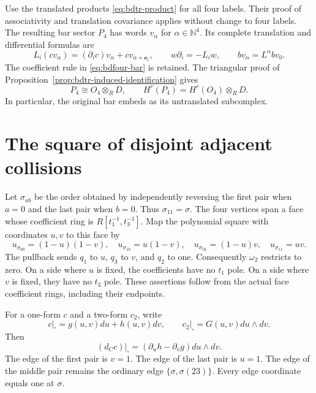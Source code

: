 Use the translated products \eqref{eq:bdtr-product} for all four labels.
Their proof of associativity and translation covariance applies without change to four labels.
The resulting bar sector $P_4$ has words $v_\alpha$ for $\alpha\in\mathbb N^4$.
Its complete translation and differential formulas are
\begin{equation}\label{eq:bdfour-jets}
 L_i(cv_\alpha)=(\partial_ic)v_\alpha+cv_{\alpha+\mathbf e_i},
 \qquad w\partial_i=-L_iw,
 \qquad bv_\alpha=L^\alpha bv_0.
\end{equation}
The coefficient rule in \eqref{eq:bdfour-bar} is retained.
The triangular proof of Proposition~\ref{prop:bdtr-induced-identification} gives
\begin{equation}\label{eq:bdfour-induced}
 P_4\cong O_4\otimes_R D,
 \qquad H^r(P_4)=H^r(O_4)\otimes_R D.
\end{equation}
In particular, the original bar embeds as its untranslated subcomplex.

\section{The square of disjoint adjacent collisions}

Let $\sigma_{ab}$ be the order obtained by independently reversing the first pair when $a=0$ and the last pair when $b=0$.
Thus $\sigma_{11}=\sigma$.
The four vertices span a face whose coefficient ring is $R[t_1^{-1},t_3^{-1}]$.
Map the polynomial square with coordinates $u,v$ to this face by
\begin{equation}\label{eq:bdfour-square}
 u_{\sigma_{00}}=(1-u)(1-v),\quad
 u_{\sigma_{10}}=u(1-v),\quad
 u_{\sigma_{01}}=(1-u)v,\quad
 u_{\sigma_{11}}=uv.
\end{equation}
The pullback sends $q_1$ to $u$, $q_3$ to $v$, and $q_2$ to one.
Consequently $\omega_2$ restricts to zero.
On a side where $u$ is fixed, the coefficients have no $t_1$ pole.
On a side where $v$ is fixed, they have no $t_3$ pole.
These assertions follow from the actual face coefficient rings, including their endpoints.

For a one-form $c$ and a two-form $c_2$, write
\[
 c|_{\square}=g(u,v)du+h(u,v)dv,
 \qquad c_2|_{\square}=G(u,v)du\wedge dv.
\]
Then
\begin{equation}\label{eq:bdfour-square-d}
 (d_Cc)|_{\square}=(\partial_uh-\partial_vg)du\wedge dv.
\end{equation}
The edge of the first pair is $v=1$.
The edge of the last pair is $u=1$.
The edge of the middle pair remains the ordinary edge $\{\sigma,\sigma(23)\}$.
Every edge coordinate equals one at $\sigma$.

